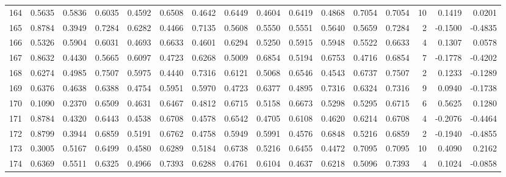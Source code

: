 \begin{tabular}{lrrrrrrrrrrrrrrr}
164 &      0.5635 &  0.5836 &  0.6035 &  0.4592 &  0.6508 &  0.4642 &  0.6449 &  0.4604 &  0.6419 &  0.4868 &   0.7054 &     0.7054 &     10 &                    0.1419 &                     0.0201 \\
165 &      0.8784 &  0.3949 &  0.7284 &  0.6282 &  0.4466 &  0.7135 &  0.5608 &  0.5550 &  0.5551 &  0.5640 &   0.5659 &     0.7284 &      2 &                   -0.1500 &                    -0.4835 \\
166 &      0.5326 &  0.5904 &  0.6031 &  0.4693 &  0.6633 &  0.4601 &  0.6294 &  0.5250 &  0.5915 &  0.5948 &   0.5522 &     0.6633 &      4 &                    0.1307 &                     0.0578 \\
167 &      0.8632 &  0.4430 &  0.5665 &  0.6097 &  0.4723 &  0.6268 &  0.5009 &  0.6854 &  0.5194 &  0.6753 &   0.4716 &     0.6854 &      7 &                   -0.1778 &                    -0.4202 \\
168 &      0.6274 &  0.4985 &  0.7507 &  0.5975 &  0.4440 &  0.7316 &  0.6121 &  0.5068 &  0.6546 &  0.4543 &   0.6737 &     0.7507 &      2 &                    0.1233 &                    -0.1289 \\
169 &      0.6376 &  0.4638 &  0.6388 &  0.4754 &  0.5951 &  0.5970 &  0.4723 &  0.6377 &  0.4895 &  0.7316 &   0.6324 &     0.7316 &      9 &                    0.0940 &                    -0.1738 \\
170 &      0.1090 &  0.2370 &  0.6509 &  0.4631 &  0.6467 &  0.4812 &  0.6715 &  0.5158 &  0.6673 &  0.5298 &   0.5295 &     0.6715 &      6 &                    0.5625 &                     0.1280 \\
171 &      0.8784 &  0.4320 &  0.6443 &  0.4538 &  0.6708 &  0.4578 &  0.6542 &  0.4705 &  0.6108 &  0.4620 &   0.6214 &     0.6708 &      4 &                   -0.2076 &                    -0.4464 \\
172 &      0.8799 &  0.3944 &  0.6859 &  0.5191 &  0.6762 &  0.4758 &  0.5949 &  0.5991 &  0.4576 &  0.6848 &   0.5216 &     0.6859 &      2 &                   -0.1940 &                    -0.4855 \\
173 &      0.3005 &  0.5167 &  0.6499 &  0.4580 &  0.6289 &  0.5184 &  0.6738 &  0.5216 &  0.6455 &  0.4472 &   0.7095 &     0.7095 &     10 &                    0.4090 &                     0.2162 \\
174 &      0.6369 &  0.5511 &  0.6325 &  0.4966 &  0.7393 &  0.6288 &  0.4761 &  0.6104 &  0.4637 &  0.6218 &   0.5096 &     0.7393 &      4 &                    0.1024 &                    -0.0858 \\

\end{tabular}
